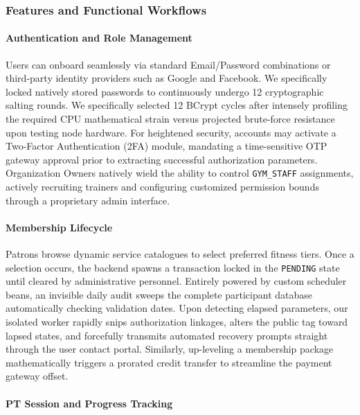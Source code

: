 \subsubsection*{Features and Functional
Workflows}\label{features-and-functional-workflows}

\paragraph*{Authentication and Role
Management}\label{authentication-and-role-management}

Users can onboard seamlessly via standard Email/Password combinations or
third-party identity providers such as Google and Facebook. We
specifically locked natively stored passwords to continuously undergo 12
cryptographic salting rounds. We specifically selected 12 BCrypt cycles
after intensely profiling the required CPU mathematical strain versus
projected brute-force resistance upon testing node hardware. For
heightened security, accounts may activate a Two-Factor Authentication
(2FA) module, mandating a time-sensitive OTP gateway approval prior to
extracting successful authorization parameters. Organization Owners
natively wield the ability to control \texttt{GYM\_STAFF} assignments,
actively recruiting trainers and configuring customized permission
bounds through a proprietary admin interface.

\paragraph*{Membership Lifecycle}\label{membership-lifecycle}

Patrons browse dynamic service catalogues to select preferred fitness
tiers. Once a selection occurs, the backend spawns a transaction locked
in the \texttt{PENDING} state until cleared by administrative personnel.
Entirely powered by custom scheduler beans, an invisible daily audit
sweeps the complete participant database automatically checking
validation dates. Upon detecting elapsed parameters, our isolated worker
rapidly snips authorization linkages, alters the public tag toward
lapsed states, and forcefully transmits automated recovery prompts
straight through the user contact portal. Similarly, up-leveling a
membership package mathematically triggers a prorated credit transfer to
streamline the payment gateway offset.

\paragraph*{PT Session and Progress
Tracking}\label{pt-session-and-progress-tracking}

